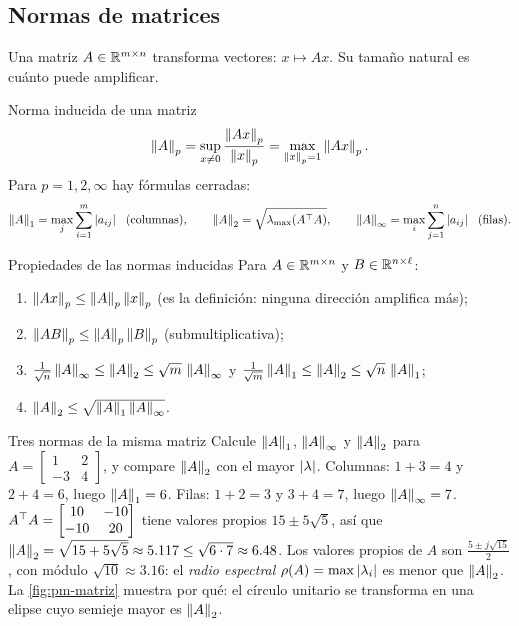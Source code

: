 
\subsection{Normas de matrices}

Una matriz $A\in\mathbb{R}^{m\times n}$ transforma vectores: $x\mapsto Ax$. Su tamaño natural es cuánto puede amplificar.

\begin{definicion}[label=def:pm-inducida]{Norma inducida de una matriz}
\[
  \left\lVert A\right\rVert_p=\sup_{x\neq0}\frac{\left\lVert Ax\right\rVert_p}{\left\lVert x\right\rVert_p}=\max_{\left\lVert x\right\rVert_p=1}\left\lVert Ax\right\rVert_p .
\]
Para $p=1,2,\infty$ hay fórmulas cerradas:
\[
  \left\lVert A\right\rVert_1=\max_j\sum_{i=1}^m\left\lvert a_{ij}\right\rvert\ \ \text{(columnas)},\qquad
  \left\lVert A\right\rVert_2=\sqrt{\lambda_{\max}(A^{\top} A)},\qquad
  \left\lVert A\right\rVert_\infty=\max_i\sum_{j=1}^n\left\lvert a_{ij}\right\rvert\ \ \text{(filas)} .
\]
\end{definicion}

\begin{proposicion}[label=prop:pm-matrices]{Propiedades de las normas inducidas}
Para $A\in\mathbb{R}^{m\times n}$ y $B\in\mathbb{R}^{n\times\ell}$:
\begin{enumerate}
  \item $\left\lVert Ax\right\rVert_p\le\left\lVert A\right\rVert_p\left\lVert x\right\rVert_p$ \quad(es la definición: ninguna dirección amplifica más);
  \item $\left\lVert AB\right\rVert_p\le\left\lVert A\right\rVert_p\left\lVert B\right\rVert_p$ \quad(submultiplicativa);
  \item $\tfrac1{\sqrt n}\left\lVert A\right\rVert_\infty\le\left\lVert A\right\rVert_2\le\sqrt m\,\left\lVert A\right\rVert_\infty$ y $\tfrac1{\sqrt m}\left\lVert A\right\rVert_1\le\left\lVert A\right\rVert_2\le\sqrt n\,\left\lVert A\right\rVert_1$;
  \item $\left\lVert A\right\rVert_2\le\sqrt{\left\lVert A\right\rVert_1\left\lVert A\right\rVert_\infty}$.
\end{enumerate}
\end{proposicion}

\begin{ejemplo}[label=ej:pm-matriz]{Tres normas de la misma matriz}
Calcule $\left\lVert A\right\rVert_1$, $\left\lVert A\right\rVert_\infty$ y $\left\lVert A\right\rVert_2$ para $A=\begin{bmatrix}1&2\\-3&4\end{bmatrix}$, y compare $\left\lVert A\right\rVert_2$ con el mayor $\left\lvert \lambda\right\rvert$.
\solucion Columnas: $1+3=4$ y $2+4=6$, luego $\left\lVert A\right\rVert_1=6$. Filas: $1+2=3$ y $3+4=7$, luego $\left\lVert A\right\rVert_\infty=7$. $A^{\top} A=\begin{bmatrix}10&-10\\-10&20\end{bmatrix}$ tiene valores propios $15\pm5\sqrt5$, así que $\left\lVert A\right\rVert_2=\sqrt{15+5\sqrt5}\approx5.117\le\sqrt{6\cdot7}\approx6.48$. Los valores propios de $A$ son $\frac{5\pm j\sqrt{15}}{2}$, con módulo $\sqrt{10}\approx3.16$: el \emph{radio espectral} $\rho(A)=\max\left\lvert \lambda_i\right\rvert$ es menor que $\left\lVert A\right\rVert_2$. La \cref{fig:pm-matriz} muestra por qué: el círculo unitario se transforma en una elipse cuyo semieje mayor es $\left\lVert A\right\rVert_2$.
\end{ejemplo}

